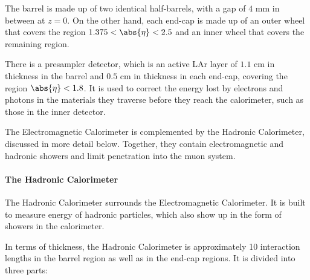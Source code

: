 The barrel is made up of two identical half-barrels, with a gap of $4$ mm in
between at $z=0$. On the other hand, each end-cap is made up of an outer wheel
that covers the region $1.375 < \abs{\eta} < 2.5$ and an inner wheel that
covers the remaining region.

There is a presampler detector, which is an active LAr layer of $1.1$ cm in
thickness in the barrel and $0.5$ cm in thickness in each end-cap, covering the
region $\abs{\eta} < 1.8$. It is used to correct the energy lost by electrons
and photons in the materials they traverse before they reach the calorimeter,
such as those in the inner detector.



The Electromagnetic Calorimeter is complemented by the Hadronic Calorimeter,
discussed in more detail below. Together, they contain electromagnetic and
hadronic showers and limit penetration into the muon system.

\paragraph{The Hadronic Calorimeter} The Hadronic Calorimeter surrounds the
Electromagnetic Calorimeter. It is built to measure energy of hadronic
particles, which also show up in the form of showers in the calorimeter.

In terms of thickness, the Hadronic Calorimeter is approximately 10 interaction
lengths in the barrel region as well as in the end-cap regions. It is divided
into three parts:

